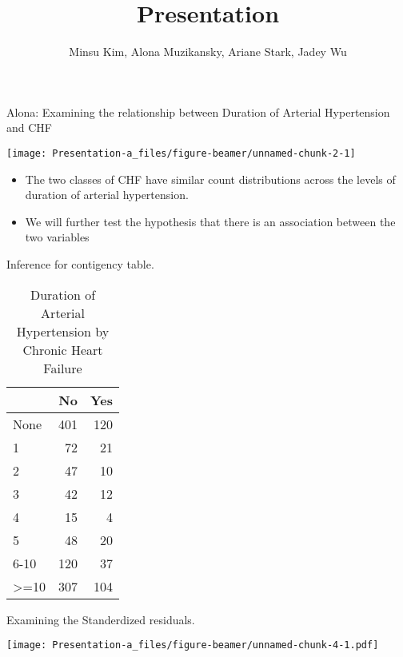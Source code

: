 \documentclass[
  ignorenonframetext,
]{beamer}
\title{Presentation}
\author{Minsu Kim, Alona Muzikansky, Ariane Stark, Jadey Wu}
\date{}
\begin{document}
\frame{\titlepage}

\begin{frame}{Alona: Examining the relationship between Duration of
Arterial Hypertension and CHF}
\protect\hypertarget{alona-examining-the-relationship-between-duration-of-arterial-hypertension-and-chf}{}

\begin{center}\texttt{[image: Presentation-a\_files/figure-beamer/unnamed-chunk-2-1]} \end{center}

\end{frame}

\begin{frame}{}
\protect\hypertarget{section}{}

\begin{itemize}
\item
  The two classes of CHF have similar count distributions across the
  levels of duration of arterial hypertension.
\item
  We will further test the hypothesis that there is an association
  between the two variables
\end{itemize}

\end{frame}

\begin{frame}{Inference for contigency table.}
\protect\hypertarget{inference-for-contigency-table.}{}

\begin{table}

\caption{\label{tab:unnamed-chunk-3}Duration of Arterial Hypertension by Chronic Heart Failure}
\centering
\begin{tabular}[t]{l|r|r}
\hline
  & No & Yes\\
\hline
None & 401 & 120\\
\hline
1 & 72 & 21\\
\hline
2 & 47 & 10\\
\hline
3 & 42 & 12\\
\hline
4 & 15 & 4\\
\hline
5 & 48 & 20\\
\hline
6-10 & 120 & 37\\
\hline
>=10 & 307 & 104\\
\hline
\end{tabular}
\end{table}

\end{frame}

\begin{frame}{Examining the Standerdized residuals.}
\protect\hypertarget{examining-the-standerdized-residuals.}{}

\texttt{[image: Presentation-a\_files/figure-beamer/unnamed-chunk-4-1.pdf]}

\end{frame}
\end{document}
